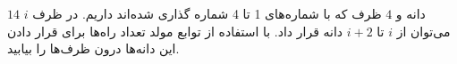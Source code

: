     \p 
    $14$
    دانه و
    $4$
    ظرف که با شماره‌های 1 تا 4 شماره گذاری شده‌اند داریم. در ظرف
    $i$
    می‌توان از 
    $i$
    تا
    $ i + 2 $
    دانه قرار داد. با استفاده از توابع مولد تعداد راه‌ها برای قرار دادن این دانه‌ها درون ظرف‌ها را بیابید.

